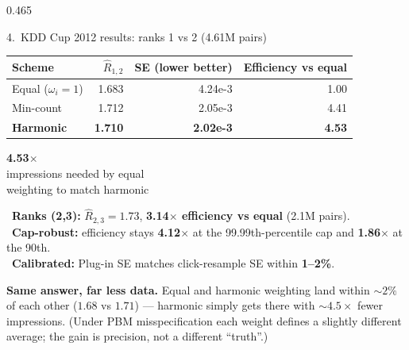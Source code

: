 \documentclass[final]{beamer}
\newcommand{\hl}[1]{\textcolor{accent}{\textbf{#1}}}
\newcommand{\cmark}{{\color{rule}\textbf{\ding{51}}}}
\begin{document}
\begin{frame}[t]{}
\begin{columns}[t]
\begin{column}{0.465\paperwidth}
\begin{block}{\textcolor{accent}{4.}\ KDD Cup 2012 results: ranks 1 vs 2 (4.61M pairs)}
\begin{center}
\setlength{\tabcolsep}{15pt}\renewcommand{\arraystretch}{1.5}
\begin{tabular}{lrrr}
\toprule
Scheme & $\hat R_{1,2}$ & SE \footnotesize(lower better) & \textbf{Efficiency vs equal}\\
\midrule
Equal ($\omega_i=1$)             & 1.683 & 4.24e-3 & 1.00\\
Min-count                        & 1.712 & 2.05e-3 & 4.41\\
\rowcolor{soft}\textbf{Harmonic} & \textbf{1.710} & \textbf{2.02e-3} & \hl{4.53}\\
\bottomrule
\end{tabular}
\end{center}
\smallskip
\begin{center}
\begin{minipage}[c]{0.48\linewidth}\centering
  {\fontsize{64}{68}\selectfont\color{accent}\textbf{4.53$\times$}}\\[0.2em]{\normalsize\color{greytext}impressions needed by equal\\weighting to match harmonic}
\end{minipage}\hfill
\begin{minipage}[c]{0.50\linewidth}\raggedright\normalsize
\cmark\ \textbf{Ranks (2,3):} $\hat R_{2,3}{=}1.73$, \textbf{3.14$\times$ efficiency vs equal} (2.1M pairs).\\[0.15em]
\cmark\ \textbf{Cap-robust:} efficiency stays \textbf{4.12$\times$} at the 99.99th-percentile cap and \textbf{1.86$\times$} at the 90th.\\[0.15em]
\cmark\ \textbf{Calibrated:} Plug-in SE matches click-resample SE within \textbf{1--2\%}.
\end{minipage}
\end{center}
\smallskip
{\small\color{greytext}\textbf{Same answer, far less data.} Equal and harmonic weighting land within ${\sim}2\%$ of each other ($1.68$ vs $1.71$) --- harmonic simply gets there with ${\sim}4.5\times$ fewer impressions. (Under PBM misspecification each weight defines a slightly different average; the gain is precision, not a different ``truth''.)}
\end{block}


\end{column}
\end{columns}
\end{frame}
\end{document}
